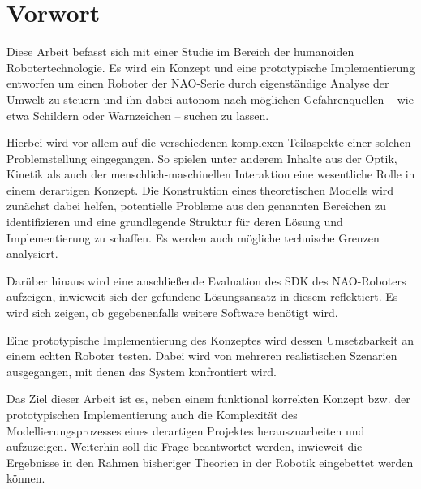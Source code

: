 \documentclass[fontsize=11pt,paper=a4,twoside,openright]{scrreprt}
\begin{document}
\renewcommand{\refname}{Literaturverzeichnis}




\newpage
\section*{}



\newpage
\section*{}

\setcapindent{0em}
\raggedbottom
\chapter*{Vorwort}
\label{sec:Vorwort}

Diese Arbeit befasst sich mit einer Studie im Bereich der humanoiden Robotertechnologie. Es wird ein Konzept und eine prototypische Implementierung entworfen um einen Roboter der NAO-Serie durch eigenständige Analyse der Umwelt zu steuern und ihn dabei autonom nach möglichen Gefahrenquellen -- wie etwa Schildern oder Warnzeichen -- suchen zu lassen.

Hierbei wird vor allem auf die verschiedenen komplexen Teilaspekte einer solchen Problemstellung eingegangen.
So spielen unter anderem Inhalte aus der Optik, Kinetik als auch der menschlich-maschinellen Interaktion eine wesentliche Rolle in einem derartigen Konzept.
Die Konstruktion eines theoretischen Modells wird zunächst dabei helfen, potentielle Probleme aus den genannten Bereichen zu identifizieren und eine grundlegende Struktur für deren Lösung und Implementierung zu schaffen.
Es werden auch mögliche technische Grenzen analysiert.

Darüber hinaus wird eine anschließende Evaluation des \gls{SDK} des NAO-Roboters aufzeigen, inwieweit sich der gefundene Lösungsansatz in diesem reflektiert.
Es wird sich zeigen, ob gegebenenfalls weitere Software benötigt wird.

Eine prototypische Implementierung des Konzeptes wird dessen Umsetzbarkeit an einem echten Roboter testen.
Dabei wird von mehreren realistischen Szenarien ausgegangen, mit denen das System konfrontiert wird.

Das Ziel dieser Arbeit ist es, neben einem funktional korrekten Konzept bzw. der prototypischen Implementierung auch die Komplexität des Modellierungsprozesses eines derartigen Projektes herauszuarbeiten und aufzuzeigen.
Weiterhin soll die Frage beantwortet werden, inwieweit die Ergebnisse in den Rahmen bisheriger Theorien in der Robotik eingebettet werden können.
\end{document}
